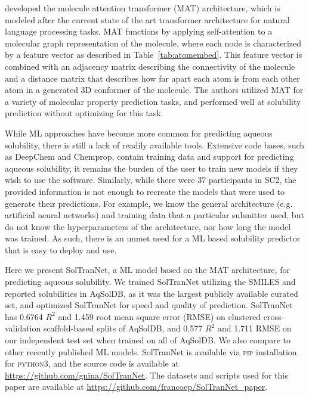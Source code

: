 \documentclass[journal=jmcmar,manuscript=article]{achemso}
\begin{document}
\citet{MAT} developed the molecule attention transformer (MAT) architecture, which is modeled after the current state of the art transformer architecture for natural language processing tasks.
MAT functions by applying self-attention to a molecular graph representation of the molecule, where each node is characterized by a feature vector as described in Table~\ref{tab:atomembed}.
This feature vector is combined with an adjacency matrix describing the connectivity of the molecule and a distance matrix that describes how far apart each atom is from each other atom in a generated 3D conformer of the molecule.
The authors utilized MAT for a variety of molecular property prediction tasks, and performed well at solubility prediction without optimizing for this task.

While ML approaches have become more common for predicting aqueous solubility, there is still a lack of readily available tools.
Extensive code bases, such as DeepChem\cite{deepchem} and Chemprop\cite{chemprop}, contain training data and support for predicting aqueous solubility, it remains the burden of the user to train new models if they wish to use the software.
Similarly, while there were 37 participants in SC2, the provided information is not enough to recreate the models that were used to generate their predictions.
For example, we know the general architecture (e.g. artificial neural networks) and training data that a particular submitter used, but do not know the hyperparameters of the architecture, nor how long the model was trained.
As such, there is an unmet need for a ML based solubility predictor that is easy to deploy and use.

Here we present SolTranNet, a ML model based on the MAT architecture, for predicting aqueous solubility.
We trained SolTranNet utilizing the SMILES and reported solubilities in AqSolDB\cite{AqSol}, as it was the largest publicly available curated set, and optimized SolTranNet for speed and quality of prediction.
SolTranNet has 0.6764 $R^2$ and 1.459 root mean square error (RMSE) on clustered cross-validation scaffold-based splits of AqSolDB, and 0.577 $R^2$ and 1.711 RMSE on our independent test set when trained on all of AqSolDB.
We also compare to other recently published ML models.\cite{lovric,cui,boobier,llinas}
SolTranNet is available via \textsc{pip} installation for \textsc{python3}, and the source code is available at \url{https://github.com/gnina/SolTranNet}. The datasets and scripts used for this paper are available at \url{https://github.com/francoep/SolTranNet_paper}.
\end{document}
